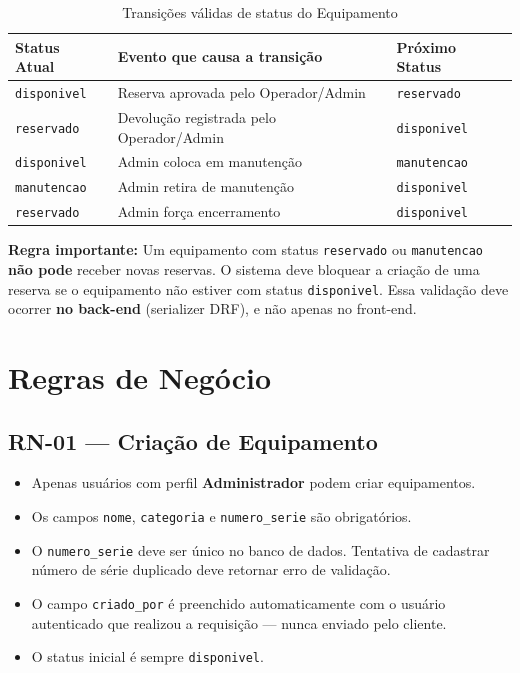 \documentclass[12pt,a4paper]{article}
\begin{document}
\begin{table}[h]
  \centering
  \begin{tabular}{lll}
    \toprule
    \textbf{Status Atual} & \textbf{Evento que causa a transição} & \textbf{Próximo Status} \\
    \midrule
    \texttt{disponivel}  & Reserva aprovada pelo Operador/Admin    & \texttt{reservado}    \\
    \texttt{reservado}   & Devolução registrada pelo Operador/Admin & \texttt{disponivel} \\
    \texttt{disponivel}  & Admin coloca em manutenção              & \texttt{manutencao}   \\
    \texttt{manutencao}  & Admin retira de manutenção              & \texttt{disponivel}   \\
    \texttt{reservado}   & Admin força encerramento                & \texttt{disponivel}   \\
    \bottomrule
  \end{tabular}
  \caption{Transições válidas de status do Equipamento}
\end{table}

\textbf{Regra importante:} Um equipamento com status \texttt{reservado} ou
\texttt{manutencao} \textbf{não pode} receber novas reservas. O sistema deve bloquear
a criação de uma reserva se o equipamento não estiver com status \texttt{disponivel}.
Essa validação deve ocorrer \textbf{no back-end} (serializer DRF), e não apenas no front-end.

\section{Regras de Negócio}

\subsection{RN-01 — Criação de Equipamento}
\begin{itemize}
  \item Apenas usuários com perfil \textbf{Administrador} podem criar equipamentos.
  \item Os campos \texttt{nome}, \texttt{categoria} e \texttt{numero\_serie} são obrigatórios.
  \item O \texttt{numero\_serie} deve ser único no banco de dados. Tentativa de cadastrar
        número de série duplicado deve retornar erro de validação.
  \item O campo \texttt{criado\_por} é preenchido automaticamente com o usuário autenticado
        que realizou a requisição — nunca enviado pelo cliente.
  \item O status inicial é sempre \texttt{disponivel}.
\end{itemize}
\end{document}
